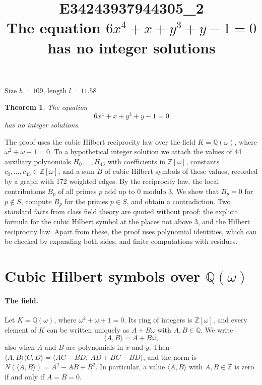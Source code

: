 \documentclass[11pt]{article}
\title{\textbf{E34243937944305\_2}\\[4pt] {\Large The equation $6x^{4}+x+y^{3}+y-1=0$ has no integer solutions}}
\author{}
\date{}
\newtheorem{theorem}{Theorem}
\newcommand{\Z}{\mathbb{Z}}
\newcommand{\Q}{\mathbb{Q}}
\begin{document}
\maketitle
\vspace{-8ex}
\begin{center}
Size $h=109$, length $l=11.58$
\end{center}

\begin{theorem}\label{thm:main}
The equation
\begin{equation}\label{eq:main}
6x^{4}+x+y^{3}+y-1=0
\end{equation}
has no integer solutions.
\end{theorem}

The proof uses the cubic Hilbert reciprocity law over the field $K=\Q(\omega)$, where $\omega^2+\omega+1=0$. To a hypothetical integer solution we attach the values of 44 auxiliary polynomials $H_0,\dots,H_{43}$ with coefficients in $\Z[\omega]$, constants $c_0,\dots,c_{43}\in\Z[\omega]$, and a sum $B$ of cubic Hilbert symbols of these values, recorded by a graph with 172 weighted edges. By the reciprocity law, the local contributions $B_p$ of all primes $p$ add up to $0$ modulo $3$. We show that $B_p=0$ for $p\notin S$, compute $B_p$ for the primes $p\in S$, and obtain a contradiction. Two standard facts from class field theory are quoted without proof: the explicit formula for the cubic Hilbert symbol at the places not above $3$, and the Hilbert reciprocity law. Apart from these, the proof uses polynomial identities, which can be checked by expanding both sides, and finite computations with residues.


\section{\texorpdfstring{Cubic Hilbert symbols over $\Q(\omega)$}{Cubic Hilbert symbols over Q(w)}}\label{sec:symbols}

\paragraph{The field.} Let $K=\Q(\omega)$, where $\omega^2+\omega+1=0$. Its ring of integers is $\Z[\omega]$, and every element of $K$ can be written uniquely as $A+B\omega$ with $A,B\in\Q$. We write
\[
\langle A,B\rangle=A+B\omega,
\]
also when $A$ and $B$ are polynomials in $x$ and $y$. Then $\langle A,B\rangle\langle C,D\rangle=\langle AC-BD,\ AD+BC-BD\rangle$, and the norm is $N(\langle A,B\rangle)=A^2-AB+B^2$. In particular, a value $\langle A,B\rangle$ with $A,B\in\Z$ is zero if and only if $A=B=0$.
\end{document}
